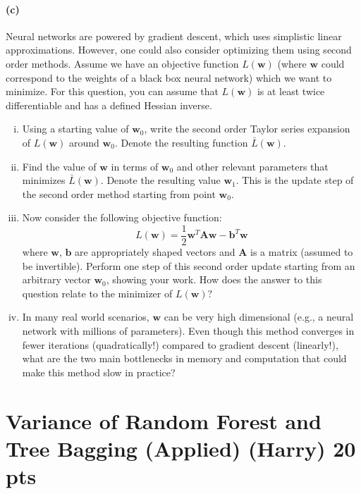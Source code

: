 \documentclass{exam}
\newcommand{\bA}{\mathbf{A}}
\newcommand{\bb}{\mathbf{b}}
\newcommand{\bw}{\mathbf{w}}
\begin{document}
\begin{enumerate}[i]
\paragraph{(c)} Neural networks are powered by gradient descent, which uses simplistic linear approximations. However, one could also consider optimizing them using second order methods. Assume we have an objective function $L(\bw)$ (where $\bw$ could correspond to the weights of a black box neural network) which we want to minimize. For this question, you can assume that $L(\bw)$ is at least twice differentiable and has a defined Hessian inverse. 
\begin{enumerate}[i.]
    \item Using a starting value of $\bw_0$, write the second order Taylor series expansion of $L(\bw)$ around $\bw_0$. Denote the resulting function $\bar{L}(\bw)$. 
  
    \item Find the value of $\bw$ in terms of $\bw_0$ and other relevant parameters that minimizes $\bar{L}(\bw)$. Denote the resulting value $\bw_1$. This is the  update step of the second order method starting from point $\bw_0$.\\
  
    \item Now consider the following objective function: \begin{equation}
    L(\bw) = \frac{1}{2}\bw^T\bA\bw - \bb^T\bw 
\end{equation}
where $\bw$, $\bb$ are appropriately shaped vectors and $\bA$ is a matrix (assumed to be invertible). Perform one step of this second order update starting from an arbitrary vector $\bw_0$, showing your work. How does the answer to this question relate to the minimizer of $L(\bw)?$\\

    \item In many real world scenarios, $\bw$ can be very high dimensional (e.g., a neural network with millions of parameters). Even though this method converges in fewer iterations (quadratically!) compared to gradient descent (linearly!), what are the two main bottlenecks in memory and computation that could make this method slow in practice?\\
  
\end{enumerate}
\end{enumerate}

\newpage

\section{Variance of Random Forest and Tree Bagging (Applied) (Harry) 20 pts}
\end{document}
